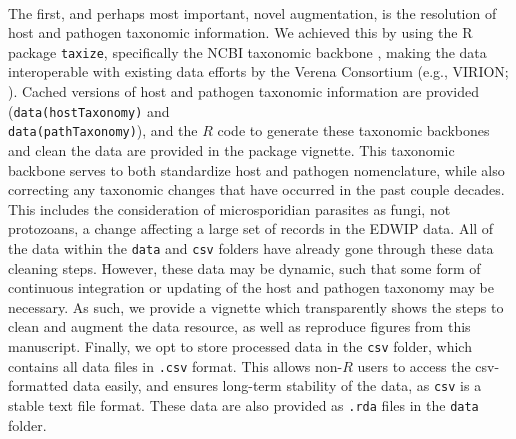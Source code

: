 \documentclass[12pt]{article}
\begin{document}
\paragraph*{}
The first, and perhaps most important, novel augmentation, is the resolution of host and pathogen taxonomic information. We achieved this by using the R package \texttt{taxize}, specifically the NCBI taxonomic backbone \citep{chamberlain2013}, making the data interoperable with existing data efforts by the Verena Consortium (e.g., VIRION; \citet{carlson2021}). Cached versions of host and pathogen taxonomic information are provided (\texttt{data(hostTaxonomy)} and \\  \texttt{data(pathTaxonomy)}), and the $R$ code to generate these taxonomic backbones and clean the data are provided in the package vignette. This taxonomic backbone serves to both standardize host and pathogen nomenclature, while also correcting any taxonomic changes that have occurred in the past couple decades. This includes the consideration of microsporidian parasites as fungi, not protozoans, a change affecting a large set of records in the EDWIP data. All of the data within the \texttt{data} and \texttt{csv} folders have already gone through these data cleaning steps. However, these data may be dynamic, such that some form of continuous integration or updating of the host and pathogen taxonomy may be necessary. As such, we provide a vignette which transparently shows the steps to clean and augment the data resource, as well as reproduce figures from this manuscript. Finally, we opt to store processed data in the \texttt{csv} folder, which contains all data files in  \texttt{.csv} format. This allows non-$R$ users to access the csv-formatted data easily, and ensures long-term stability of the data, as \texttt{csv} is a stable text file format. These data are also provided as \texttt{.rda} files in the \texttt{data} folder. 
\end{document}
